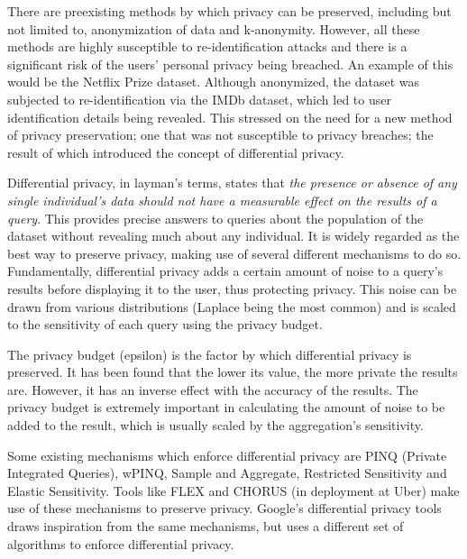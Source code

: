 \documentclass[acmsmall]{acmart}
\begin{document}
There are preexisting methods by which privacy can be preserved, including but not limited to, anonymization of data and k-anonymity. However, all these methods are highly susceptible to re-identification attacks and there is a significant risk of the users’ personal privacy being breached. An example of this would be the Netflix Prize dataset. Although anonymized, the dataset was subjected to re-identification via the IMDb dataset, which led to user identification details being revealed. This stressed on the need for a new method of privacy preservation; one that was not susceptible to privacy breaches; the result of which introduced the concept of differential privacy. 

Differential privacy, in layman’s terms, states that {\itshape the presence or absence of any single individual’s data should not have a measurable effect on the results of a query}. This provides precise answers to queries about the population of the dataset without revealing much about any individual. It is widely regarded as the best way to preserve privacy, making use of several different mechanisms to do so. Fundamentally, differential privacy adds a certain amount of noise to a query’s results before displaying it to the user, thus protecting privacy. This noise can be drawn from various distributions (Laplace being the most common) and is scaled to the sensitivity of each query using the privacy budget. 

The privacy budget (epsilon) is the factor by which differential privacy is preserved. It has been found that the lower its value, the more private the results are. However, it has an inverse effect with the accuracy of the results. The privacy budget is extremely important in calculating the amount of noise to be added to the result, which is usually scaled by the aggregation’s sensitivity.

Some existing mechanisms which enforce differential privacy are PINQ (Private Integrated Queries), wPINQ, Sample and Aggregate, Restricted Sensitivity and Elastic Sensitivity. Tools like FLEX and CHORUS (in deployment at Uber) make use of these mechanisms to preserve privacy. Google’s differential privacy tools draws inspiration from the same mechanisms, but uses a different set of algorithms to enforce differential privacy. 
\end{document}
